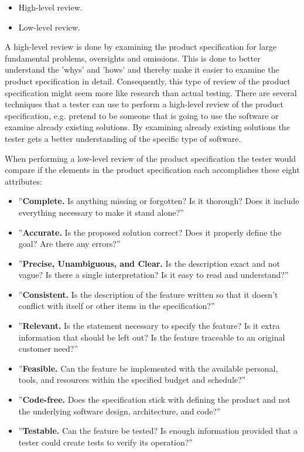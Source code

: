 \begin{itemize}
	\item High-level review.
	\item Low-level review.
\end{itemize}

A high-level review is done by examining the product specification for large fundamental problems, oversights and omissions.
This is done to better understand the 'whys' and 'hows' and thereby make it easier to examine the product specification in detail.
Consequently, this type of review of the product specification might seem more like research than actual testing.
There are several techniques that a tester can use to perform a high-level review of the product specification, e.g. pretend to be someone that is going to use the software or examine already existing solutions.
By examining already existing solutions the tester gets a better understanding of the specific type of software. \cite{SoftwareTesting}

When performing a low-level review of the product specification the tester would compare if the elements in the product specification each accomplishes these eight attributes: \cite{SoftwareTesting}

\begin{itemize}
	\item ''\textbf{Complete.} Is anything missing or forgotten? Is it thorough? Does it include everything necessary to make it stand alone?''
	\item ''\textbf{Accurate.} Is the proposed solution correct? Does it properly define the goal? Are there any errors?''
	\item ''\textbf{Precise, Unambiguous, and Clear.} Is the description exact and not vague? Is there a single interpretation? Is it easy to read and understand?''
	\item ''\textbf{Consistent.} Is the description of the feature written so that it doesn't conflict with itself or other items in the specification?''
	\item ''\textbf{Relevant.} Is the statement necessary to specify the feature? Is it extra information that should be left out? Is the feature traceable to an original customer need?''
	\item ''\textbf{Feasible.} Can the feature be implemented with the available personal, tools, and resources within the specified budget and schedule?''
	\item ''\textbf{Code-free.} Does the specification stick with defining the product and not the underlying software design, architecture, and code?''
	\item ''\textbf{Testable.} Can the feature be tested? Is enough information provided that a tester could create tests to verify its operation?''
\end{itemize}

